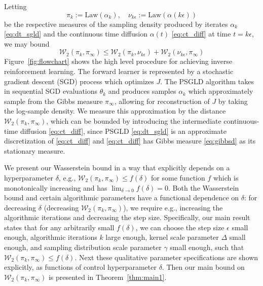 \documentclass[journal,onecolumn]{IEEEtran}
\newcommand{\alk}{\alpha_k}
\newcommand{\thk}{\theta_k}
\newcommand{\step}{\epsilon}
\newcommand{\rew}{J}
\newcommand{\alt}{\alpha(t)}
\newcommand{\wass}{\mathcal{W}_2}
\newcommand{\gibbs}{\ids_{\infty}}
\newcommand{\dtlaw}{\ids_{k}} %
\newcommand{\ctlaw}{\nu_{k\step}}
\newcommand{\law}{\textrm{Law}}
\newcommand{\ids}{\pi}
\newcommand{\idw}{\gamma}
\newcommand{\ksp}{k,\idw}
\begin{document}
Letting 
\[\dtlaw := \law(\alk), \quad \ctlaw := \law(\alpha(k\step))\] be the respective measures of the sampling density produced by iterates $\alk$ \eqref{eq:dt_sgld} and the continuous time diffusion $\alt$ \eqref{eq:ct_diff} at time $t=k\step$, we may bound 
\[ \wass(\dtlaw,\gibbs) \leq \wass(\dtlaw,\ctlaw) + \wass(\ctlaw,\gibbs)\] Figure~\ref{fig:flowchart} shows the high level procedure for achieving inverse reinforcement learning. The forward learner is represented by a stochastic gradient descent (SGD) process which optimizes $\rew$. The PSGLD algorithm takes in sequential SGD evaluations $\thk$ and produces samples $\alk$ which approximately sample from the Gibbs measure $\gibbs$, allowing for reconstruction of $\rew$ by taking the log-sample density. We measure this approximation by the distance $\wass(\dtlaw,\gibbs)$, which can be bounded by introducing the intermediate continuous-time diffusion \eqref{eq:ct_diff}, since PSGLD \eqref{eq:dt_sgld} is an approximate discretization of \eqref{eq:ct_diff} and \eqref{eq:ct_diff} has Gibbs measure \eqref{eq:gibbsd} as its stationary measure. 




We present our Wasserstein bound in a way that explicitly depends on a hyperparameter $\delta$, e.g., $\wass(\dtlaw,\gibbs) \leq f(\delta)$ for some function $f$ which is monotonically increasing and has $\lim_{\delta\to0}f(\delta)=0$. Both the Wasserstein bound and certain algorithmic parameters have a functional dependence on $\delta$: for decreasing $\delta$ (decreasing $\wass(\dtlaw,\gibbs)$), we require e.g., increasing the algorithmic iterations and decreasing the step size. Specifically, our main result states that for any arbitrarily small $f(\delta)$, we can choose the step size $\step$ small enough, algorithmic iterations $k$ large enough, kernel scale parameter $\Delta$ small enough, and sampling distribution scale parameter $\idw$ small enough, such that $\wass(\dtlaw,\gibbs) \leq f(\delta)$. Next these qualitative parameter specifications are shown explicitly, as functions of control hyperparameter $\delta$. Then our main bound on $\wass(\dtlaw,\gibbs)$ is presented in Theorem~\ref{thm:main1}. 
\end{document}
